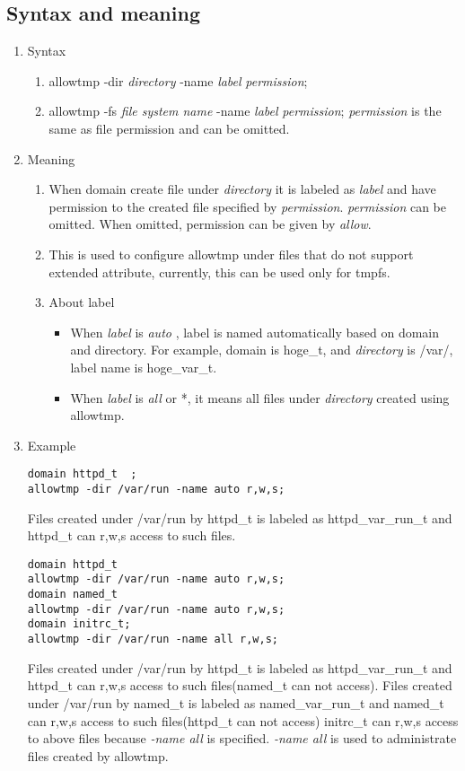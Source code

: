\documentclass{article}
\begin{document}
\subsection{Syntax and meaning}
\begin{enumerate}
 \item Syntax
       \begin{enumerate}
	\item allowtmp -dir {\it directory} -name {\it label} {\it
	      permission};
	\item  allowtmp -fs {\it file system name} -name {\it label} {\it
	      permission};
	      {\it permission} is the same as file permission and can be omitted.
       \end{enumerate}
 \item Meaning\\
       \begin{enumerate}
	\item When domain create file under {\it directory} it is
	      labeled as {\it label} and have permission to the created
	      file specified by {\it permission}. {\it permission} can
	      be omitted. When omitted, permission can be given by {\it allow}.
	\item This is used to configure allowtmp under files that do not
	      support extended attribute, currently, this can be used
	      only for tmpfs.
	\item About label
	      \begin{itemize}
	       \item When {\it label} is {\it auto }, label is named
		     automatically based on domain and directory. For example,
		     domain is hoge\_t, and {\it directory} is /var/, label
		     name is hoge\_var\_t.
	       \item When {\it label} is {\it all} or *, it means all
		     files under {\it directory} created using allowtmp.
	      \end{itemize}           
       \end{enumerate}       
 \item Example\\
       \begin{verbatim}
domain httpd_t	;
allowtmp -dir /var/run -name auto r,w,s;
       \end{verbatim}
Files created under /var/run by httpd\_t is labeled as
       httpd\_var\_run\_t and httpd\_t can r,w,s access to such files.

\begin{verbatim}
domain httpd_t
allowtmp -dir /var/run -name auto r,w,s;
domain named_t
allowtmp -dir /var/run -name auto r,w,s;
domain initrc_t;
allowtmp -dir /var/run -name all r,w,s;
\end{verbatim}
Files created under /var/run by httpd\_t is labeled as
       httpd\_var\_run\_t and httpd\_t can r,w,s access to such
       files(named\_t can not access).
Files created under /var/run by named\_t is labeled as
       named\_var\_run\_t and named\_t can r,w,s access to such
       files(httpd\_t can not access)
initrc\_t can r,w,s access to above files because {\it -name all} is
       specified. {\it -name all} is used to administrate files created
       by allowtmp.


\end{enumerate}
\end{document}
